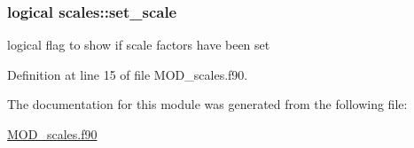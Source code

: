 \hypertarget{classscales_a15927af9fdc131ae21d41c8b9dd8d5e5}{
\subsubsection[{set\-\_\-scale}]{\setlength{\rightskip}{0pt plus 5cm}logical scales\-::set\-\_\-scale}}\label{classscales_a15927af9fdc131ae21d41c8b9dd8d5e5}


logical flag to show if scale factors have been set 



Definition at line 15 of file M\-O\-D\-\_\-scales.\-f90.



The documentation for this module was generated from the following file\-:\begin{DoxyCompactItemize}
\item 
\hyperlink{MOD__scales_8f90}{M\-O\-D\-\_\-scales.\-f90}\end{DoxyCompactItemize}
